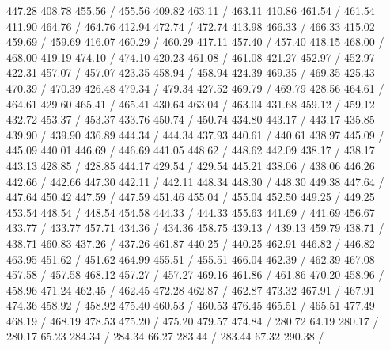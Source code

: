{ 447.28 408.78 455.56 /
 455.56 409.82 463.11 /
 463.11 410.86 461.54 /
 461.54 411.90 464.76 /
 464.76 412.94 472.74 /
 472.74 413.98 466.33 /
 466.33 415.02 459.69 /
 459.69 416.07 460.29 /
 460.29 417.11 457.40 /
 457.40 418.15 468.00 /
 468.00 419.19 474.10 /
 474.10 420.23 461.08 /
 461.08 421.27 452.97 /
 452.97 422.31 457.07 /
 457.07 423.35 458.94 /
 458.94 424.39 469.35 /
 469.35 425.43 470.39 /
 470.39 426.48 479.34 /
 479.34 427.52 469.79 /
 469.79 428.56 464.61 /
 464.61 429.60 465.41 /
 465.41 430.64 463.04 /
 463.04 431.68 459.12 /
 459.12 432.72 453.37 /
 453.37 433.76 450.74 /
 450.74 434.80 443.17 /
 443.17 435.85 439.90 /
 439.90 436.89 444.34 /
 444.34 437.93 440.61 /
 440.61 438.97 445.09 /
 445.09 440.01 446.69 /
 446.69 441.05 448.62 /
 448.62 442.09 438.17 /
 438.17 443.13 428.85 /
 428.85 444.17 429.54 /
 429.54 445.21 438.06 /
 438.06 446.26 442.66 /
 442.66 447.30 442.11 /
 442.11 448.34 448.30 /
 448.30 449.38 447.64 /
 447.64 450.42 447.59 /
 447.59 451.46 455.04 /
 455.04 452.50 449.25 /
 449.25 453.54 448.54 /
 448.54 454.58 444.33 /
 444.33 455.63 441.69 /
 441.69 456.67 433.77 /
 433.77 457.71 434.36 /
 434.36 458.75 439.13 /
 439.13 459.79 438.71 /
 438.71 460.83 437.26 /
 437.26 461.87 440.25 /
 440.25 462.91 446.82 /
 446.82 463.95 451.62 /
 451.62 464.99 455.51 /
 455.51 466.04 462.39 /
 462.39 467.08 457.58 /
 457.58 468.12 457.27 /
 457.27 469.16 461.86 /
 461.86 470.20 458.96 /
 458.96 471.24 462.45 /
 462.45 472.28 462.87 /
 462.87 473.32 467.91 /
 467.91 474.36 458.92 /
 458.92 475.40 460.53 /
 460.53 476.45 465.51 /
 465.51 477.49 468.19 /
 468.19 478.53 475.20 /
 475.20 479.57 474.84 /
\setsolid
{} 280.72 64.19 280.17 /
 280.17 65.23 284.34 /
 284.34 66.27 283.44 /
 283.44 67.32 290.38 /
}
